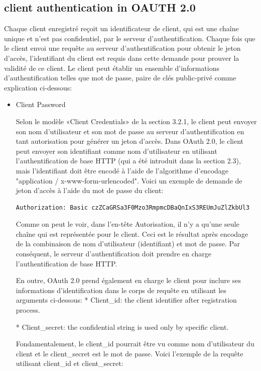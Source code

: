 \subsection{client authentication in OAUTH 2.0}

Chaque client enregistré reçoit un identificateur de client, qui est une chaîne unique et n'est pas confidentiel, par le serveur d'authentification. Chaque fois que le client envoi une requête au serveur d'authentification pour obtenir le jeton d'accès, l'identifiant du client est requis dans cette demande pour prouver la validité de ce client. Le client peut établir un ensemble d'informations d'authentification telles que mot de passe, paire de clés public-privé comme explication ci-dessous:
\begin{itemize}
\item Client Password

Selon le modèle «Client Credentials» de la section 3.2.1, le client peut envoyer son nom d'utilisateur et son mot de passe au serveur d'authentification en tant autorisation pour générer un jeton d'accès. Dans OAuth 2.0, le client peut envoyer son identifiant comme nom d'utilisateur en utilisant l'authentification de base HTTP (qui a été introduit dans la section 2.3), mais l'identifiant doit être encodé à l'aide de l'algorithme d'encodage "application / x-www-form-urlencoded". Voici un exemple de demande de jeton d'accès à l'aide du mot de passe du client:


\begin{verbatim}
Authorization: Basic czZCaGRSa3F0Mzo3RmpmcDBaQnIxS3REUmJuZlZkbUl3
\end{verbatim}


Comme on peut le voir, dans l'en-tête Autorisation, il n'y a qu'une seule chaîne qui est représentée pour le client. Ceci est le résultat après encodage de la combinaison de nom d'utilisateur (identifiant) et mot de passe. Par conséquent, le serveur d'authentification doit prendre en charge l'authentification de base HTTP.

En outre, OAuth 2.0 prend également en charge le client pour inclure ses informations d'identification dans le corps de requête en utilisant les arguments ci-dessous:
* Client\_id: the client identifier after registration process.

* Client\_secret: the confidential string is used only by specific client.

Fondamentalement, le client\_id pourrait être vu comme nom d'utilisateur du client et le client\_secret est le mot de passe. Voici l'exemple de la requête utilisant client\_id et client\_secret:




\end{itemize}
